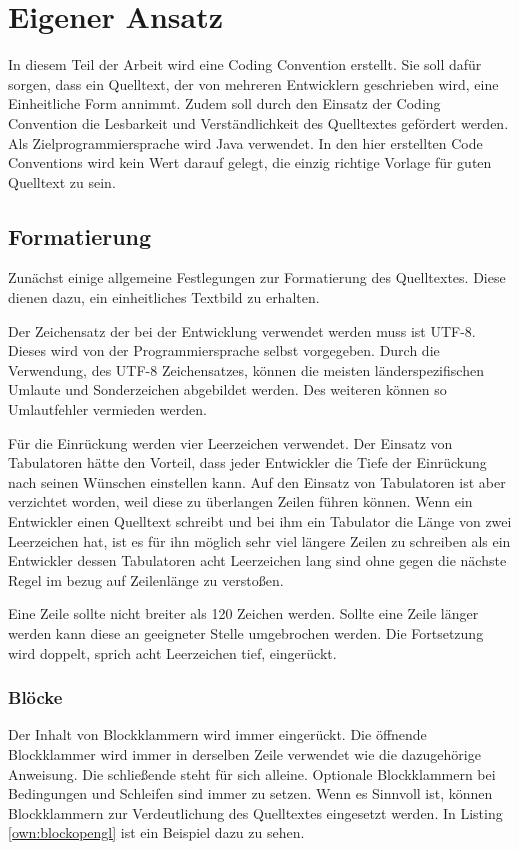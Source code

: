 \section{Eigener Ansatz}

In diesem Teil der Arbeit wird eine Coding Convention erstellt. Sie soll dafür sorgen, dass ein Quelltext, der von mehreren Entwicklern geschrieben wird, eine Einheitliche Form annimmt. Zudem soll durch den Einsatz der Coding Convention die Lesbarkeit und Verständlichkeit des Quelltextes gefördert werden. Als Zielprogrammiersprache wird Java verwendet. In den hier erstellten Code Conventions wird kein Wert darauf gelegt, die einzig richtige Vorlage für guten Quelltext zu sein. 


\subsection{Formatierung}
Zunächst einige allgemeine Festlegungen zur Formatierung des Quelltextes. Diese dienen dazu, ein einheitliches Textbild zu erhalten.

Der Zeichensatz der bei der Entwicklung verwendet werden muss ist UTF-8. Dieses wird von der Programmiersprache selbst vorgegeben. Durch die Verwendung, des UTF-8 Zeichensatzes, können die meisten länderspezifischen Umlaute und Sonderzeichen abgebildet werden. Des weiteren können so Umlautfehler vermieden werden.

Für die Einrückung werden vier Leerzeichen verwendet. Der Einsatz von Tabulatoren hätte den Vorteil, dass jeder Entwickler die Tiefe der Einrückung nach seinen Wünschen einstellen kann. Auf den Einsatz von Tabulatoren ist aber verzichtet worden, weil diese zu überlangen Zeilen führen können. Wenn ein Entwickler einen Quelltext schreibt und bei ihm ein Tabulator die Länge von zwei Leerzeichen hat, ist es für ihn möglich sehr viel längere Zeilen zu schreiben als ein Entwickler dessen Tabulatoren acht Leerzeichen lang sind ohne gegen die nächste Regel im bezug auf Zeilenlänge zu verstoßen.

Eine Zeile sollte nicht breiter als 120 Zeichen werden. Sollte eine Zeile länger werden kann diese an geeigneter Stelle umgebrochen werden. Die Fortsetzung wird doppelt, sprich acht Leerzeichen tief, eingerückt.

\subsubsection{Blöcke}
Der Inhalt von Blockklammern wird immer eingerückt. Die öffnende Blockklammer wird immer in derselben Zeile verwendet wie die dazugehörige Anweisung. Die schließende steht für sich alleine. Optionale Blockklammern bei Bedingungen und Schleifen sind immer zu setzen. Wenn es Sinnvoll ist, können Blockklammern zur Verdeutlichung des Quelltextes eingesetzt werden. In Listing \ref{own:blockopengl} ist ein Beispiel dazu zu sehen.


